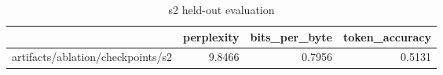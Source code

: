 \begin{table}[t]
\centering
\begin{tabular}{lrrr}
\toprule
 & perplexity & bits\_per\_byte & token\_accuracy \\
\midrule
artifacts/ablation/checkpoints/s2 & 9.8466 & 0.7956 & 0.5131 \\
\bottomrule
\end{tabular}
\caption{s2 held-out evaluation}
\label{tab:s2-eval}
\end{table}
